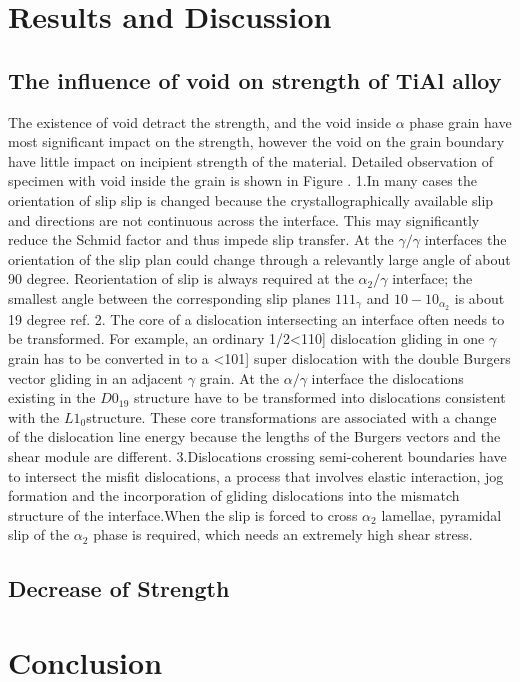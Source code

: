 \documentclass[final,5p,times,twocolumn]{elsarticle}
\begin{document}
\section{Results and Discussion}
\subsection{The influence of void on strength of TiAl alloy}
The existence of void detract the strength, and the void inside $\alpha$ phase grain have most significant  impact on the strength, however the void on the grain boundary have little impact on incipient strength of the material. Detailed observation of specimen with void inside the grain is shown in Figure \cite{}.
1.In many cases the orientation of slip slip is changed because the crystallographically available slip and directions are not continuous across the interface. This may significantly reduce the Schmid factor and thus impede slip transfer. At the $\gamma/\gamma$ interfaces the orientation of the slip plan could change through a relevantly large angle of about 90 degree. Reorientation of slip is always required at the $\alpha_{2} / \gamma$ interface; the smallest angle between the corresponding slip planes ${1 1 1 }_{\gamma}$ and ${ 1 0 -1 0}_{\alpha_2}$ is about 19 degree ref{}.
2. The core of  a dislocation intersecting an interface often needs to be transformed. For example, an ordinary 1/2<110] dislocation gliding in one $\gamma$ grain has to be converted in to a <101] super dislocation with the double Burgers vector gliding in an adjacent $\gamma$ grain. At the $\alpha/\gamma$ interface the dislocations existing in the $D0_{19}$ structure have to be transformed into dislocations consistent with the $L1_0$structure. These core transformations are associated with a change of the dislocation line energy because the lengths of the Burgers vectors and the shear module are different.
3.Dislocations crossing semi-coherent boundaries have to intersect the misfit dislocations, a process that involves elastic interaction, jog formation and the incorporation of gliding dislocations into the mismatch structure of the interface.When the slip is forced to cross $\alpha_2$ lamellae, pyramidal slip of the $\alpha_2$ phase is required, which needs an extremely high shear stress.


\subsection{Decrease of Strength}
\section{Conclusion}

%

\end{document}
